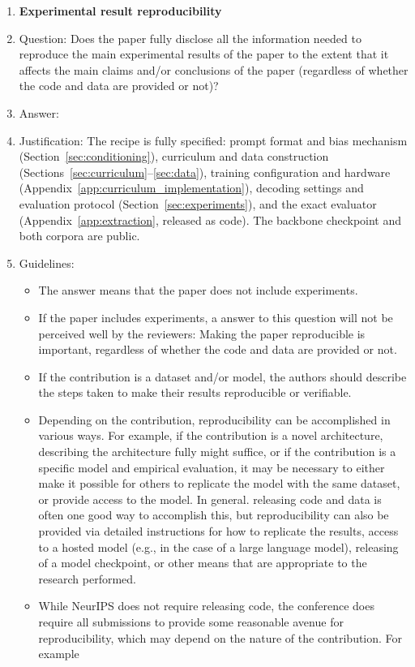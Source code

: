 \documentclass{article}
\begin{document}
\begin{enumerate}
    \item {\bf Experimental result reproducibility}
    \item[] Question: Does the paper fully disclose all the information needed to reproduce the main experimental results of the paper to the extent that it affects the main claims and/or conclusions of the paper (regardless of whether the code and data are provided or not)?
    \item[] Answer: \answerYes{}
    \item[] Justification: The recipe is fully specified: prompt format and bias mechanism (Section~\ref{sec:conditioning}), curriculum and data construction (Sections~\ref{sec:curriculum}--\ref{sec:data}), training configuration and hardware (Appendix~\ref{app:curriculum_implementation}), decoding settings and evaluation protocol (Section~\ref{sec:experiments}), and the exact evaluator (Appendix~\ref{app:extraction}, released as code). The backbone checkpoint and both corpora are public.
    \item[] Guidelines:
    \begin{itemize}
        \item The answer \answerNA{} means that the paper does not include experiments.
        \item If the paper includes experiments, a \answerNo{} answer to this question will not be perceived well by the reviewers: Making the paper reproducible is important, regardless of whether the code and data are provided or not.
        \item If the contribution is a dataset and\slash or model, the authors should describe the steps taken to make their results reproducible or verifiable. 
        \item Depending on the contribution, reproducibility can be accomplished in various ways. For example, if the contribution is a novel architecture, describing the architecture fully might suffice, or if the contribution is a specific model and empirical evaluation, it may be necessary to either make it possible for others to replicate the model with the same dataset, or provide access to the model. In general. releasing code and data is often one good way to accomplish this, but reproducibility can also be provided via detailed instructions for how to replicate the results, access to a hosted model (e.g., in the case of a large language model), releasing of a model checkpoint, or other means that are appropriate to the research performed.
        \item While NeurIPS does not require releasing code, the conference does require all submissions to provide some reasonable avenue for reproducibility, which may depend on the nature of the contribution. For example

\end{itemize}
\end{enumerate}
\end{document}
